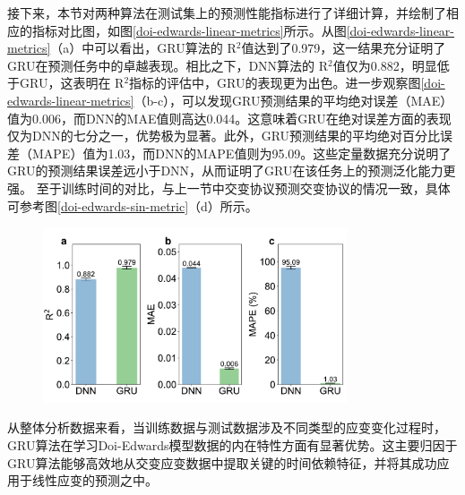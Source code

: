 接下来，本节对两种算法在测试集上的预测性能指标进行了详细计算，并绘制了相应的指标对比图，如图\ref{doi-edwards-linear-metrics}所示。从图\ref{doi-edwards-linear-metrics}（a）中可以看出，GRU算法的 R$^2$值达到了0.979，这一结果充分证明了GRU在预测任务中的卓越表现。相比之下，DNN算法的 R$^2$值仅为0.882，明显低于GRU，这表明在 R$^2$指标的评估中，GRU的表现更为出色。进一步观察图\ref{doi-edwards-linear-metrics}（b-c），可以发现GRU预测结果的平均绝对误差（MAE）值为0.006，而DNN的MAE值则高达0.044。这意味着GRU在绝对误差方面的表现仅为DNN的七分之一，优势极为显著。此外，GRU预测结果的平均绝对百分比误差（MAPE）值为1.03，而DNN的MAPE值则为95.09。这些定量数据充分说明了GRU的预测结果误差远小于DNN，从而证明了GRU在该任务上的预测泛化能力更强。
至于训练时间的对比，与上一节中交变协议预测交变协议的情况一致，具体可参考图\ref{doi-edwards-sin-metric}（d）所示。
\begin{figure}[htbp]
  \centering
  \includegraphics[width=0.8\textwidth]{Fig/doi-edwards-linear-metrics.pdf}
  \FigureBicaption{\label{doi-edwards-linear-metrics}}{}
\end{figure}
从整体分析数据来看，当训练数据与测试数据涉及不同类型的应变变化过程时，GRU算法在学习Doi-Edwards模型数据的内在特性方面有显著优势。这主要归因于GRU算法能够高效地从交变应变数据中提取关键的时间依赖特征，并将其成功应用于线性应变的预测之中。

